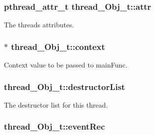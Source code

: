 \subsubsection[{\texorpdfstring{attr}{attr}}]{\setlength{\rightskip}{0pt plus 5cm}pthread\+\_\+attr\+\_\+t thread\+\_\+\+Obj\+\_\+t\+::attr}\hypertarget{structthread___obj__t_acd96155ef5b50606df67487c09bb8027}{}\label{structthread___obj__t_acd96155ef5b50606df67487c09bb8027}


The thread\textquotesingle{}s attributes. 

\subsubsection[{\texorpdfstring{context}{context}}]{$\ast$ thread\+\_\+\+Obj\+\_\+t\+::context}\hypertarget{structthread___obj__t_a869152fd4ea3fbad33d5436f2d7f337f}{}\label{structthread___obj__t_a869152fd4ea3fbad33d5436f2d7f337f}


Context value to be passed to main\+Func. 

\subsubsection[{\texorpdfstring{destructor\+List}{destructorList}}]{ thread\+\_\+\+Obj\+\_\+t\+::destructor\+List}\hypertarget{structthread___obj__t_aba2bf90f94c8204f7c1a75eddd74126b}{}\label{structthread___obj__t_aba2bf90f94c8204f7c1a75eddd74126b}


The destructor list for this thread. 

\subsubsection[{\texorpdfstring{event\+Rec}{eventRec}}]{ thread\+\_\+\+Obj\+\_\+t\+::event\+Rec}\hypertarget{structthread___obj__t_a41732035120c5783abedcf29e5aa8e08}{}\label{structthread___obj__t_a41732035120c5783abedcf29e5aa8e08}


